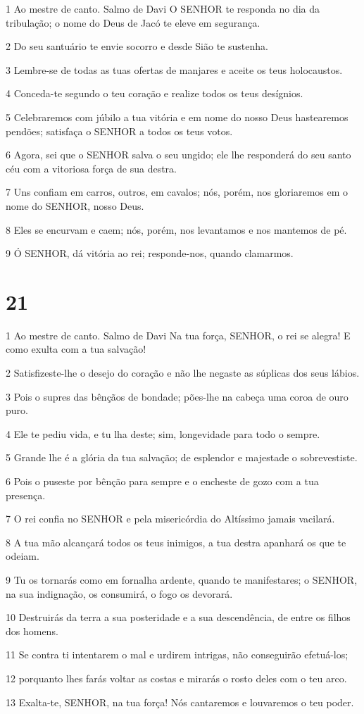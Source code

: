 \par 1 Ao mestre de canto. Salmo de Davi O SENHOR te responda no dia da tribulação; o nome do Deus de Jacó te eleve em segurança.
\par 2 Do seu santuário te envie socorro e desde Sião te sustenha.
\par 3 Lembre-se de todas as tuas ofertas de manjares e aceite os teus holocaustos.
\par 4 Conceda-te segundo o teu coração e realize todos os teus desígnios.
\par 5 Celebraremos com júbilo a tua vitória e em nome do nosso Deus hastearemos pendões; satisfaça o SENHOR a todos os teus votos.
\par 6 Agora, sei que o SENHOR salva o seu ungido; ele lhe responderá do seu santo céu com a vitoriosa força de sua destra.
\par 7 Uns confiam em carros, outros, em cavalos; nós, porém, nos gloriaremos em o nome do SENHOR, nosso Deus.
\par 8 Eles se encurvam e caem; nós, porém, nos levantamos e nos mantemos de pé.
\par 9 Ó SENHOR, dá vitória ao rei; responde-nos, quando clamarmos.

\chapter{21}

\par 1 Ao mestre de canto. Salmo de Davi Na tua força, SENHOR, o rei se alegra! E como exulta com a tua salvação!
\par 2 Satisfizeste-lhe o desejo do coração e não lhe negaste as súplicas dos seus lábios.
\par 3 Pois o supres das bênçãos de bondade; pões-lhe na cabeça uma coroa de ouro puro.
\par 4 Ele te pediu vida, e tu lha deste; sim, longevidade para todo o sempre.
\par 5 Grande lhe é a glória da tua salvação; de esplendor e majestade o sobrevestiste.
\par 6 Pois o puseste por bênção para sempre e o encheste de gozo com a tua presença.
\par 7 O rei confia no SENHOR e pela misericórdia do Altíssimo jamais vacilará.
\par 8 A tua mão alcançará todos os teus inimigos, a tua destra apanhará os que te odeiam.
\par 9 Tu os tornarás como em fornalha ardente, quando te manifestares; o SENHOR, na sua indignação, os consumirá, o fogo os devorará.
\par 10 Destruirás da terra a sua posteridade e a sua descendência, de entre os filhos dos homens.
\par 11 Se contra ti intentarem o mal e urdirem intrigas, não conseguirão efetuá-los;
\par 12 porquanto lhes farás voltar as costas e mirarás o rosto deles com o teu arco.
\par 13 Exalta-te, SENHOR, na tua força! Nós cantaremos e louvaremos o teu poder.


